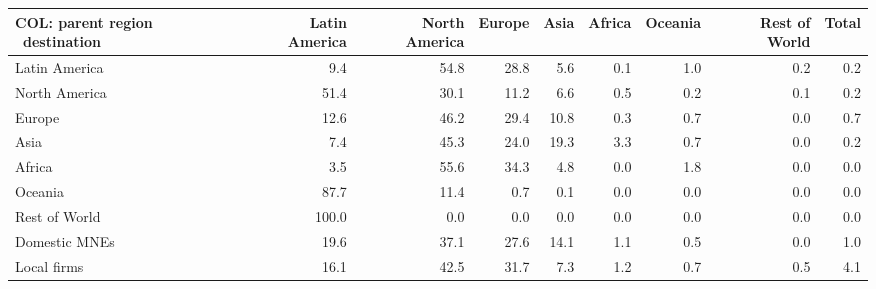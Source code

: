\begin{tabular}{lrrrrrrrr}
\toprule
COL: parent region \ destination & Latin America & North America & Europe & Asia & Africa & Oceania & Rest of World & Total \\
\midrule
Latin America & 9.4 & 54.8 & 28.8 & 5.6 & 0.1 & 1.0 & 0.2 & 0.2 \\
North America & 51.4 & 30.1 & 11.2 & 6.6 & 0.5 & 0.2 & 0.1 & 0.2 \\
Europe & 12.6 & 46.2 & 29.4 & 10.8 & 0.3 & 0.7 & 0.0 & 0.7 \\
Asia & 7.4 & 45.3 & 24.0 & 19.3 & 3.3 & 0.7 & 0.0 & 0.2 \\
Africa & 3.5 & 55.6 & 34.3 & 4.8 & 0.0 & 1.8 & 0.0 & 0.0 \\
Oceania & 87.7 & 11.4 & 0.7 & 0.1 & 0.0 & 0.0 & 0.0 & 0.0 \\
Rest of World & 100.0 & 0.0 & 0.0 & 0.0 & 0.0 & 0.0 & 0.0 & 0.0 \\
Domestic MNEs & 19.6 & 37.1 & 27.6 & 14.1 & 1.1 & 0.5 & 0.0 & 1.0 \\
Local firms & 16.1 & 42.5 & 31.7 & 7.3 & 1.2 & 0.7 & 0.5 & 4.1 \\
\bottomrule
\end{tabular}
